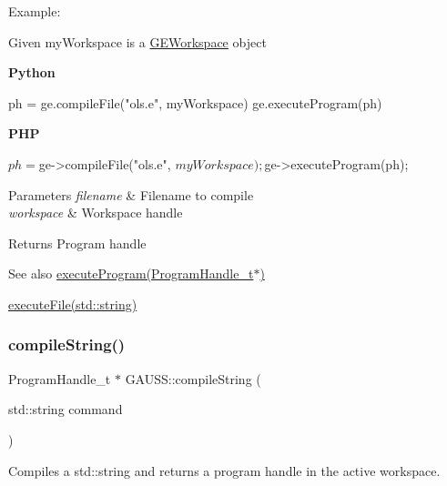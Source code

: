 Example\+:

Given {\ttfamily my\+Workspace} is a \hyperlink{class_g_e_workspace}{G\+E\+Workspace} object

{\bfseries Python} 
\begin{DoxyCode}
ph = ge.compileFile(\textcolor{stringliteral}{"ols.e"}, myWorkspace)
ge.executeProgram(ph)
\end{DoxyCode}


{\bfseries P\+HP} 
\begin{DoxyCode}
$ph = $ge->compileFile(\textcolor{stringliteral}{"ols.e"}, $myWorkspace);
$ge->executeProgram(ph);
\end{DoxyCode}



\begin{DoxyParams}{Parameters}
{\em filename} & Filename to compile \\
\hline
{\em workspace} & Workspace handle \\
\hline
\end{DoxyParams}
\begin{DoxyReturn}{Returns}
Program handle
\end{DoxyReturn}
\begin{DoxySeeAlso}{See also}
\hyperlink{class_g_a_u_s_s_a7fc9de69421c14aadb9a6310fecabcca}{execute\+Program(\+Program\+Handle\+\_\+t$\ast$)} 

\hyperlink{class_g_a_u_s_s_a949037ab9f5c49d94a0c7962dac0548d}{execute\+File(std\+::string)} 
\end{DoxySeeAlso}
\mbox{\label{class_g_a_u_s_s_a3ecf1522874c8ae5aa8fb8173d515b73}} 
\subsubsection{\texorpdfstring{compile\+String()}{compileString()}\hspace{0.1cm}{\footnotesize\ttfamily [1/2]}}
{\footnotesize\ttfamily Program\+Handle\+\_\+t $\ast$ G\+A\+U\+S\+S\+::compile\+String (\begin{DoxyParamCaption}\item[{std\+::string}]{command }\end{DoxyParamCaption})}



Compiles a std\+::string and returns a program handle in the active workspace. 


